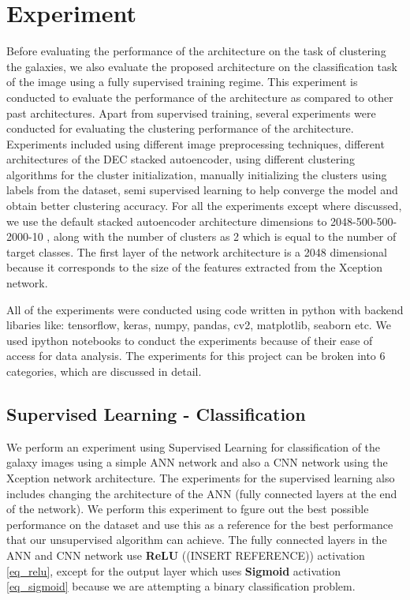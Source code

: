 \documentclass{article}
\begin{document}
\section{Experiment}
Before evaluating the performance of the architecture on the task of clustering the galaxies, we also evaluate the proposed architecture on the classification task of the image using a fully supervised training regime. This experiment is conducted to evaluate the performance of the architecture as compared to other past architectures. Apart from supervised training, several experiments were conducted for evaluating the clustering performance of the architecture. Experiments included using different image preprocessing techniques, different architectures of the DEC stacked autoencoder, using different clustering algorithms for the cluster initialization, manually initializing the clusters using labels from the dataset, semi supervised learning to help converge the model and obtain better clustering accuracy. For all the experiments except where discussed, we use the default stacked autoencoder architecture dimensions to 2048-500-500-2000-10 \cite{dec}, along with the number of clusters as 2 which is equal to the number of target classes. The first layer of the network architecture is a 2048 dimensional because it corresponds to the size of the features extracted from the Xception network.

All of the experiments were conducted using code written in python with backend libaries like: tensorflow, keras, numpy, pandas, cv2, matplotlib, seaborn etc. We used ipython notebooks to conduct the experiments because of their ease of access for data analysis. The experiments for this project can be broken into 6 categories, which are discussed in detail. 


\subsection{Supervised Learning - Classification}
We perform an experiment using Supervised Learning for classification of the galaxy images using a simple ANN network and also a CNN network using the Xception network architecture. The experiments for the supervised learning also includes changing the architecture of the ANN (fully connected layers at the end of the network). We perform this experiment to fgure out the best possible performance on the dataset and use this as a reference for the best performance that our unsupervised algorithm can achieve. The fully connected layers in the ANN and CNN network use \textbf{ReLU} ((INSERT REFERENCE)) activation \eqref{eq_relu}, except for the output layer which uses \textbf{Sigmoid} activation \eqref{eq_sigmoid} because we are attempting a binary classification problem.
\end{document}
